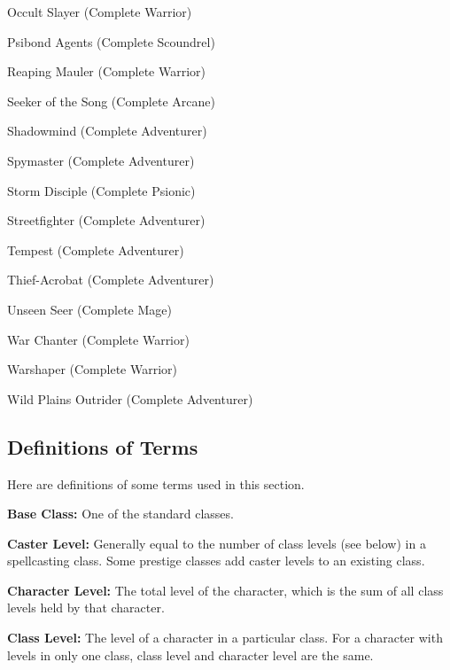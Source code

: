 \begin{itemize*}
\item Occult Slayer (Complete Warrior)
\item Psibond Agents (Complete Scoundrel)
\item Reaping Mauler (Complete Warrior)
\item Seeker of the Song (Complete Arcane)
\item Shadowmind (Complete Adventurer)
\item Spymaster (Complete Adventurer)
\item Storm Disciple (Complete Psionic)
\item Streetfighter (Complete Adventurer)
\item Tempest (Complete Adventurer)
\item Thief-Acrobat (Complete Adventurer)
\item Unseen Seer (Complete Mage)
\item War Chanter (Complete Warrior)
\item Warshaper (Complete Warrior)
\item Wild Plains Outrider (Complete Adventurer)
\end{itemize*}

\subsection{Definitions of Terms}
Here are definitions of some terms used in this section.

\textbf{Base Class:} One of the standard classes.

\textbf{Caster Level:} Generally equal to the number of class levels (see below) in a spellcasting class. Some prestige classes add caster levels to an existing class.

\textbf{Character Level:} The total level of the character, which is the sum of all class levels held by that character.

\textbf{Class Level:} The level of a character in a particular class. For a character with levels in only one class, class level and character level are the same.

